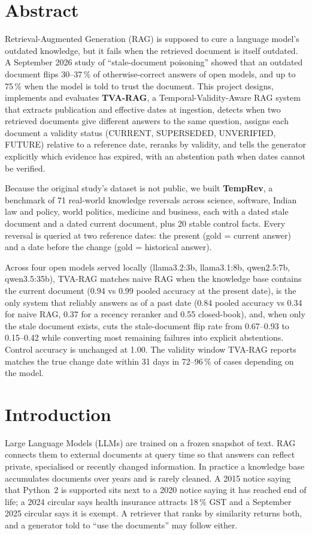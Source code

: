 \documentclass[11pt,a4paper]{report}
\begin{document}
\chapter*{Abstract}
Retrieval-Augmented Generation (RAG) is supposed to cure a language model's outdated knowledge, but it fails when the retrieved document is itself outdated. A September 2026 study of ``stale-document poisoning'' showed that an outdated document flips 30--37\,\% of otherwise-correct answers of open models, and up to 75\,\% when the model is told to trust the document. This project designs, implements and evaluates \textbf{TVA-RAG}, a Temporal-Validity-Aware RAG system that extracts publication and effective dates at ingestion, detects when two retrieved documents give different answers to the same question, assigns each document a validity status (CURRENT, SUPERSEDED, UNVERIFIED, FUTURE) relative to a reference date, reranks by validity, and tells the generator explicitly which evidence has expired, with an abstention path when dates cannot be verified.

Because the original study's dataset is not public, we built \textbf{TempRev}, a benchmark of 71 real-world knowledge reversals across science, software, Indian law and policy, world politics, medicine and business, each with a dated stale document and a dated current document, plus 20 stable control facts. Every reversal is queried at two reference dates: the present (gold = current answer) and a date before the change (gold = historical answer).

Across four open models served locally (llama3.2:3b, llama3.1:8b, qwen2.5:7b, qwen3.5:35b), TVA-RAG matches naive RAG when the knowledge base contains the current document (0.94 vs 0.99 pooled accuracy at the present date), is the only system that reliably answers as of a past date (0.84 pooled accuracy vs 0.34 for naive RAG, 0.37 for a recency reranker and 0.55 closed-book), and, when only the stale document exists, cuts the stale-document flip rate from 0.67--0.93 to 0.15--0.42 while converting most remaining failures into explicit abstentions. Control accuracy is unchanged at 1.00. The validity window TVA-RAG reports matches the true change date within 31 days in 72--96\,\% of cases depending on the model.

\tableofcontents
\listoffigures
\listoftables

\chapter{Introduction}
Large Language Models (LLMs) are trained on a frozen snapshot of text. RAG connects them to external documents at query time so that answers can reflect private, specialised or recently changed information. In practice a knowledge base accumulates documents over years and is rarely cleaned. A 2015 notice saying that Python~2 is supported sits next to a 2020 notice saying it has reached end of life; a 2024 circular says health insurance attracts 18\,\% GST and a September 2025 circular says it is exempt. A retriever that ranks by similarity returns both, and a generator told to ``use the documents'' may follow either.
\end{document}
